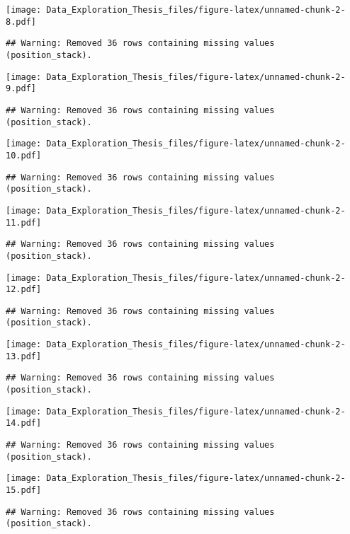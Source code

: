 \documentclass[]{article}
\begin{document}
\texttt{[image: Data\_Exploration\_Thesis\_files/figure-latex/unnamed-chunk-2-8.pdf]}

\begin{verbatim}
## Warning: Removed 36 rows containing missing values (position_stack).
\end{verbatim}

\texttt{[image: Data\_Exploration\_Thesis\_files/figure-latex/unnamed-chunk-2-9.pdf]}

\begin{verbatim}
## Warning: Removed 36 rows containing missing values (position_stack).
\end{verbatim}

\texttt{[image: Data\_Exploration\_Thesis\_files/figure-latex/unnamed-chunk-2-10.pdf]}

\begin{verbatim}
## Warning: Removed 36 rows containing missing values (position_stack).
\end{verbatim}

\texttt{[image: Data\_Exploration\_Thesis\_files/figure-latex/unnamed-chunk-2-11.pdf]}

\begin{verbatim}
## Warning: Removed 36 rows containing missing values (position_stack).
\end{verbatim}

\texttt{[image: Data\_Exploration\_Thesis\_files/figure-latex/unnamed-chunk-2-12.pdf]}

\begin{verbatim}
## Warning: Removed 36 rows containing missing values (position_stack).
\end{verbatim}

\texttt{[image: Data\_Exploration\_Thesis\_files/figure-latex/unnamed-chunk-2-13.pdf]}

\begin{verbatim}
## Warning: Removed 36 rows containing missing values (position_stack).
\end{verbatim}

\texttt{[image: Data\_Exploration\_Thesis\_files/figure-latex/unnamed-chunk-2-14.pdf]}

\begin{verbatim}
## Warning: Removed 36 rows containing missing values (position_stack).
\end{verbatim}

\texttt{[image: Data\_Exploration\_Thesis\_files/figure-latex/unnamed-chunk-2-15.pdf]}

\begin{verbatim}
## Warning: Removed 36 rows containing missing values (position_stack).
\end{verbatim}
\end{document}
